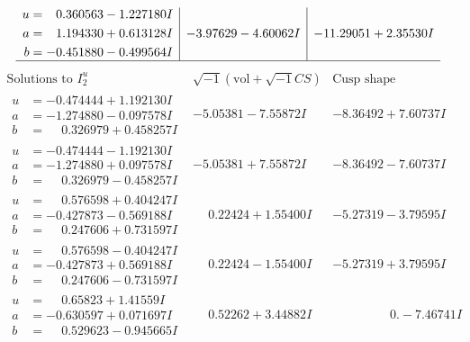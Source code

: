 \documentclass[1p]{elsarticle_modified}
\theoremstyle{definition}
\newcommand{\I}{\sqrt{-1}}
\begin{document}
$$\begin{array}{c|c|c}
\begin{aligned}
u &= \phantom{-}0.360563 - 1.227180 I \\
a &= \phantom{-}1.194330 + 0.613128 I \\
b &= -0.451880 - 0.499564 I\end{aligned}
 & -3.97629 - 4.60062 I & -11.29051 + 2.35530 I\\
 \hline 
 \end{array}$$\newpage$$\begin{array}{c|c|c}  
\text{Solutions to }I^u_{2}& \I (\text{vol} + \sqrt{-1}CS) & \text{Cusp shape}\\
 \hline 
\begin{aligned}
u &= -0.474444 + 1.192130 I \\
a &= -1.274880 - 0.097578 I \\
b &= \phantom{-}0.326979 + 0.458257 I\end{aligned}
 & -5.05381 - 7.55872 I & -8.36492 + 7.60737 I \\ \hline\begin{aligned}
u &= -0.474444 - 1.192130 I \\
a &= -1.274880 + 0.097578 I \\
b &= \phantom{-}0.326979 - 0.458257 I\end{aligned}
 & -5.05381 + 7.55872 I & -8.36492 - 7.60737 I \\ \hline\begin{aligned}
u &= \phantom{-}0.576598 + 0.404247 I \\
a &= -0.427873 - 0.569188 I \\
b &= \phantom{-}0.247606 + 0.731597 I\end{aligned}
 & \phantom{-}0.22424 + 1.55400 I & -5.27319 - 3.79595 I \\ \hline\begin{aligned}
u &= \phantom{-}0.576598 - 0.404247 I \\
a &= -0.427873 + 0.569188 I \\
b &= \phantom{-}0.247606 - 0.731597 I\end{aligned}
 & \phantom{-}0.22424 - 1.55400 I & -5.27319 + 3.79595 I \\ \hline\begin{aligned}
u &= \phantom{-}0.65823 + 1.41559 I \\
a &= -0.630597 + 0.071697 I \\
b &= \phantom{-}0.529623 - 0.945665 I\end{aligned}
 & \phantom{-}0.52262 + 3.44882 I & \phantom{-0.000000 } 0. - 7.46741 I \\ \hline\begin{aligned}

\end{aligned}
\end{array}$$
\end{document}
